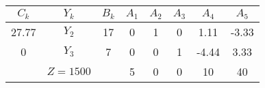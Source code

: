 \begin{tabular}{cccccccc}
\hline
\hline
$C_k$  & $Y_k$  & $B_k$  & $A_1$  & $A_2$  & $A_3$  & $A_4$  & $A_5$ \bigstrut\\
\hline
27.77  & $Y_2$  & 17     & 0      & 1      & 0      & 1.11   & -3.33 \bigstrut[t]\\
0      & $Y_3$  & 7      & 0      & 0      & 1      & -4.44  & 3.33 \bigstrut[b]\\
\hline
       & $Z=1500$ &        & 5      & 0      & 0      & 10     & 40 \bigstrut\\
\hline
\hline
\end{tabular}%
